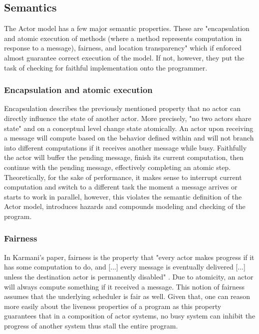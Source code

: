 \documentclass[A4]{article}
\begin{document}
\subsection{Semantics}
The Actor model has a few major semantic properties. These are "encapsulation and atomic execution of methods (where a method represents computation in response to a message), fairness, and location transparency" \cite[p.~4]{reference/parallel/KarmaniA11} which if enforced almost guarantee correct execution of the model. If not, however, they put the task of checking for faithful implementation onto the programmer. 
\subsubsection{Encapsulation and atomic execution}
Encapsulation describes the previously mentioned property that no actor can directly influence the state of another actor. More precisely, "no two actors share state" \cite[p.~4]{reference/parallel/KarmaniA11} and on a conceptual level change state atomically. An actor upon receiving a message will compute based on the behavior defined within and will not branch into different computations if it receives another message while busy. Faithfully the actor will buffer the pending message, finish its current computation, then continue with the pending message, effectively completing an atomic step. 
Theoretically, for the sake of performance, it makes sense to interrupt current computation and switch to a different task the moment a message arrives or starts to work in parallel, however, this violates the semantic definition of the Actor model, introduces hazards and compounds modeling and checking of the program.
\subsubsection{Fairness}
In Karmani's paper, fairness is the property that "every actor makes progress if it has some computation to do, and [...] every message is eventually delivered [...] unless the destination actor is permanently disabled" \cite[p.~5]{reference/parallel/KarmaniA11}. Due to atomicity, an actor will always compute something if it received a message. 
This notion of fairness assumes that the underlying scheduler is fair as well. 
Given that, one can reason more easily about the liveness properties of a program \cite[p.~5]{reference/parallel/KarmaniA11} as this property guarantees that in a composition of actor systems, no busy system can inhibit the progress of another system thus stall the entire program.
\end{document}
